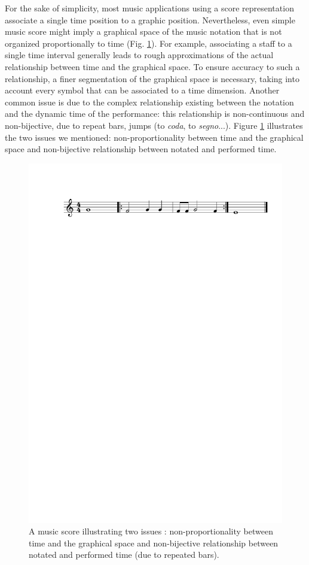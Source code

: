 \documentclass[letterpaper, 12pt]{article}
\begin{document}
For the sake of simplicity, most music applications using a score representation associate a single time position to a graphic position. Nevertheless, even simple music score might imply a graphical space of the music notation that is not organized proportionally to time (Fig. \ref{fig-repeat}).  For example, associating a staff to a single time interval generally leads to rough approximations of the actual relationship between time and the graphical space. To ensure accuracy to such a relationship, a finer segmentation of the graphical space is necessary, taking into account every symbol that can be associated to a time dimension.  Another common issue is due to the complex relationship existing between the notation and the dynamic time of the performance: this relationship is non-continuous and non-bijective, due to repeat bars, jumps (to \emph{coda}, to \emph{segno}...). Figure \ref{fig-repeat} illustrates the two issues we mentioned: non-proportionality between time and the graphical space and non-bijective relationship between notated and performed time.
\begin{figure} %
\begin{center}
	\includegraphics[width=1.3\baseimgwidth]{imgs/fig-repeat}
\caption{A music score illustrating two issues : non-proportionality between  time and the graphical space and non-bijective relationship between notated and performed time (due to repeated bars).}
\label{fig-repeat}
\end{center}
\end{figure}
\end{document}
